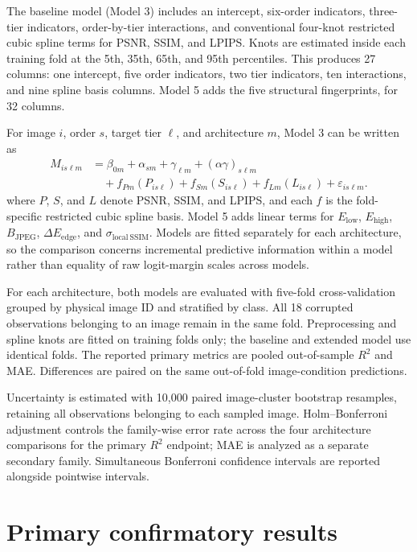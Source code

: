 \documentclass[10pt,twocolumn]{article}
\begin{document}
The baseline model (Model 3) includes an intercept, six-order indicators, three-tier indicators, order-by-tier interactions, and conventional four-knot restricted cubic spline terms for PSNR, SSIM, and LPIPS. Knots are estimated inside each training fold at the 5th, 35th, 65th, and 95th percentiles. This produces 27 columns: one intercept, five order indicators, two tier indicators, ten interactions, and nine spline basis columns. Model 5 adds the five structural fingerprints, for 32 columns.

For image $i$, order $s$, target tier $\ell$, and architecture $m$, Model 3 can be written as
\begin{equation}
\begin{aligned}
M_{is\ell m} &= \beta_{0m}+\alpha_{sm}+\gamma_{\ell m}+(\alpha\gamma)_{s\ell m}\\
&\quad + f_{Pm}(P_{is\ell})+f_{Sm}(S_{is\ell})+f_{Lm}(L_{is\ell})+\varepsilon_{is\ell m}.
\end{aligned}
\end{equation}
where $P$, $S$, and $L$ denote PSNR, SSIM, and LPIPS, and each $f$ is the fold-specific restricted cubic spline basis. Model 5 adds linear terms for $E_{\mathrm{low}}$, $E_{\mathrm{high}}$, $B_{\mathrm{JPEG}}$, $\Delta E_{\mathrm{edge}}$, and $\sigma_{\mathrm{local\ SSIM}}$. Models are fitted separately for each architecture, so the comparison concerns incremental predictive information within a model rather than equality of raw logit-margin scales across models.

For each architecture, both models are evaluated with five-fold cross-validation grouped by physical image ID and stratified by class. All 18 corrupted observations belonging to an image remain in the same fold. Preprocessing and spline knots are fitted on training folds only; the baseline and extended model use identical folds. The reported primary metrics are pooled out-of-sample $R^2$ and MAE. Differences are paired on the same out-of-fold image-condition predictions.

Uncertainty is estimated with 10,000 paired image-cluster bootstrap resamples, retaining all observations belonging to each sampled image. Holm--Bonferroni adjustment controls the family-wise error rate across the four architecture comparisons for the primary $R^2$ endpoint; MAE is analyzed as a separate secondary family. Simultaneous Bonferroni confidence intervals are reported alongside pointwise intervals.

\section{Primary confirmatory results}
\end{document}
